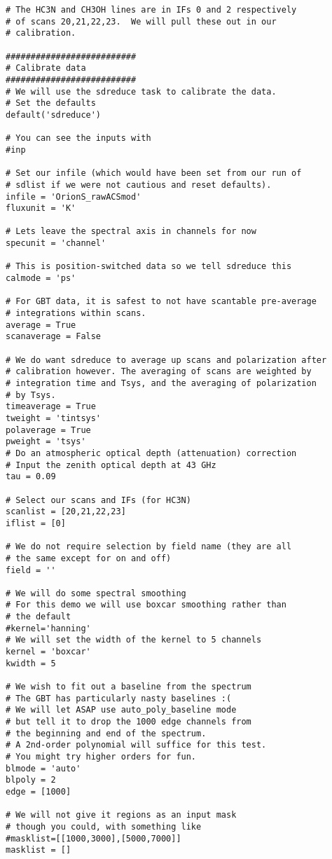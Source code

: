 \normalsize
\begin{verbatim}
# The HC3N and CH3OH lines are in IFs 0 and 2 respectively
# of scans 20,21,22,23.  We will pull these out in our
# calibration.

##########################
# Calibrate data
##########################
# We will use the sdreduce task to calibrate the data.
# Set the defaults
default('sdreduce')

# You can see the inputs with
#inp

# Set our infile (which would have been set from our run of
# sdlist if we were not cautious and reset defaults).
infile = 'OrionS_rawACSmod'
fluxunit = 'K'

# Lets leave the spectral axis in channels for now
specunit = 'channel'

# This is position-switched data so we tell sdreduce this
calmode = 'ps'

# For GBT data, it is safest to not have scantable pre-average
# integrations within scans.
average = True
scanaverage = False

# We do want sdreduce to average up scans and polarization after
# calibration however. The averaging of scans are weighted by 
# integration time and Tsys, and the averaging of polarization 
# by Tsys.
timeaverage = True
tweight = 'tintsys'
polaverage = True
pweight = 'tsys'
# Do an atmospheric optical depth (attenuation) correction
# Input the zenith optical depth at 43 GHz
tau = 0.09

# Select our scans and IFs (for HC3N)
scanlist = [20,21,22,23]
iflist = [0]

# We do not require selection by field name (they are all
# the same except for on and off)
field = ''

# We will do some spectral smoothing
# For this demo we will use boxcar smoothing rather than
# the default
#kernel='hanning'
# We will set the width of the kernel to 5 channels
kernel = 'boxcar'
kwidth = 5

# We wish to fit out a baseline from the spectrum
# The GBT has particularly nasty baselines :(
# We will let ASAP use auto_poly_baseline mode
# but tell it to drop the 1000 edge channels from
# the beginning and end of the spectrum.
# A 2nd-order polynomial will suffice for this test.
# You might try higher orders for fun.
blmode = 'auto'
blpoly = 2
edge = [1000]

# We will not give it regions as an input mask
# though you could, with something like
#masklist=[[1000,3000],[5000,7000]]
masklist = []


\end{verbatim}
